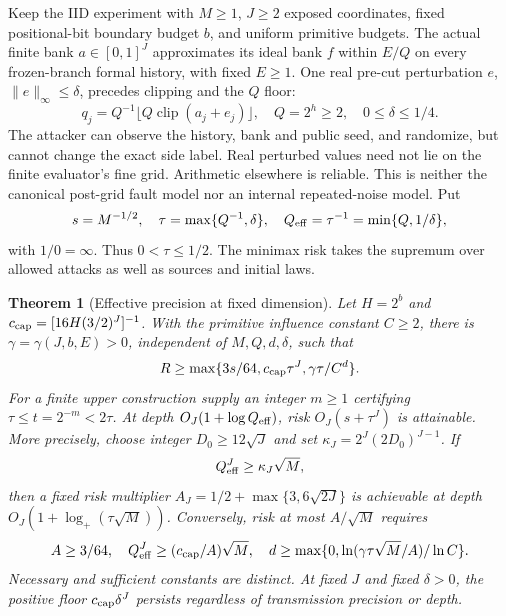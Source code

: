 \documentclass[11pt,letterpaper]{article}
\newtheorem{theorem}{Theorem}[section]
\theoremstyle{definition}\newtheorem{definition}[theorem]{Definition}
\theoremstyle{remark}\newtheorem{remark}[theorem]{Remark}
\begin{document}
Keep the IID experiment with $M\ge1$, $J\ge2$ exposed coordinates, fixed positional-bit boundary budget $b$, and uniform primitive budgets. The actual finite bank $a\in[0,1]^J$ approximates its ideal bank $f$ within $E/Q$ on every frozen-branch formal history, with fixed $E\ge1$. One real pre-cut perturbation $e$, $\|e\|_\infty\le\delta$, precedes clipping and the $Q$ floor:
\[
 q_j=Q^{-1}\lfloor Q\operatorname{clip}(a_j+e_j)\rfloor,
 \quad Q=2^h\ge2,\quad 0\le\delta\le1/4.
\]
The attacker can observe the history, bank and public seed, and randomize, but cannot change the exact side label. Real perturbed values need not lie on the finite evaluator's fine grid. Arithmetic elsewhere is reliable. This is neither the canonical post-grid fault model nor an internal repeated-noise model.
Put
\[
 s=M^{-1/2},\quad \tau=\max\{Q^{-1},\delta\},\quad
 Q_{\rm eff}=\tau^{-1}=\min\{Q,1/\delta\},
\]
with $1/0=\infty$. Thus $0<\tau\le1/2$. The minimax risk takes the supremum over allowed attacks as well as sources and initial laws.
\begin{theorem}[Effective precision at fixed dimension]\label{thm:effectiveprecision}
Let $H=2^b$ and $c_{\rm cap}=[16H(3/2)^J]^{-1}$. With the primitive influence constant $C\ge2$, there is $\gamma=\gamma(J,b,E)>0$, independent of $M,Q,d,\delta$, such that
\begin{equation}\label{eq:noiseeffectivefloor}
 R\ge\max\{3s/64,c_{\rm cap}\tau^J,\gamma\tau/C^d\}.
\end{equation}
For a finite upper construction supply an integer $m\ge1$ certifying
$\tau\le t=2^{-m}<2\tau$. At depth $O_J(1+\log Q_{\rm eff})$, risk $O_J(s+\tau^J)$ is attainable. More precisely, choose integer $D_0\ge12\sqrt J$ and set $\kappa_J=2^J(2D_0)^{J-1}$. If
\[
 Q_{\rm eff}^J\ge\kappa_J\sqrt M,
\]
then a fixed risk multiplier $A_J=1/2+\max\{3,6\sqrt{2J}\}$ is achievable at depth
$O_J(1+\log_+(\tau\sqrt M))$. Conversely, risk at most $A/\sqrt M$ requires
\[
 A\ge3/64,\quad Q_{\rm eff}^J\ge(c_{\rm cap}/A)\sqrt M,\quad
 d\ge\max\{0,\ln(\gamma\tau\sqrt M/A)/\ln C\}.
\]
Necessary and sufficient constants are distinct. At fixed $J$ and fixed $\delta>0$, the positive floor $c_{\rm cap}\delta^J$ persists regardless of transmission precision or depth.
\end{theorem}
\end{document}
